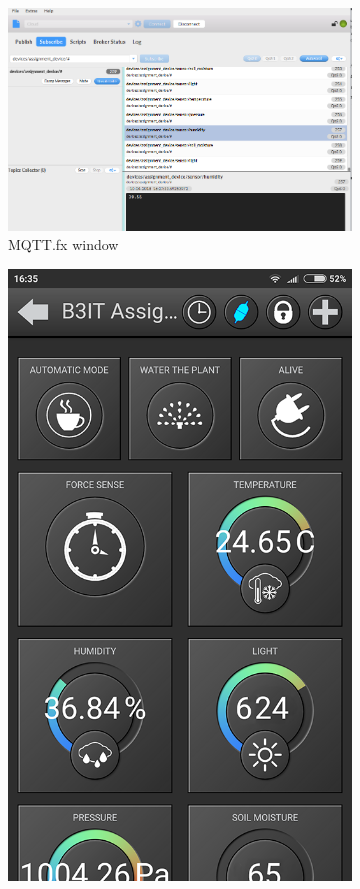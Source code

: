 \documentclass[11pt,a4paper]{article}
\begin{document}
\begin{figure}
\begin{subfigure}[h]{0.65\linewidth}
\includegraphics[width=\linewidth]{mqtt_fx}
\caption{MQTT.fx window}
\label{fig:mqttFX}
\end{subfigure}
\hfill
\begin{subfigure}[h]{0.3\linewidth}
\includegraphics[width=\linewidth]{mqtt_buddy}

\end{subfigure}
\end{figure}
\end{document}
